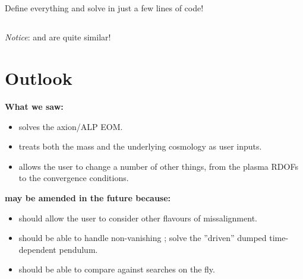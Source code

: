 \documentclass[10pt,utf8,compress,xcolor=dvipsnames]{beamer}
\begin{document}
\subsection{\PY}
\begin{frame}[fragile]{\insertsubsectionhead}
	Define everything and solve in just a few lines of code!\\[-0.15cm]
	\lstset{language = python}
	
	
\end{frame}
\subsection{\CPP}
\begin{frame}[fragile]{\insertsubsectionhead}
	
	{\em Notice}: \CPP and \PY are quite similar!\\[-0.15cm]
	\lstset{language = c++}
	
\end{frame}

\section{Outlook}

\begin{frame}[fragile]{\insertsectionhead}
	\begin{center}
		\bf{What we saw:}
	\end{center}
	\begin{itemize}
		\item \mimes solves the axion/ALP EOM. 
		\item \mimes treats both the mass and the underlying cosmology as user inputs.
		\item \mimes allows the user to change a number of other things, from the plasma RDOFs to the convergence conditions.\\[0.5cm] 
	\end{itemize}
	
	\begin{center}
		\bf{\mimes may be amended in the future because:} 
	\end{center}
	\begin{itemize}
		\item \mimes should allow the user to consider other flavours of missalignment.
		\item \mimes should be able to handle non-vanishing \rhs; \ie solve the ''driven'' dumped time-dependent pendulum.
		\item \mimes should be able to compare against searches on the fly. 
	\end{itemize}
	
\end{frame}
\end{document}
